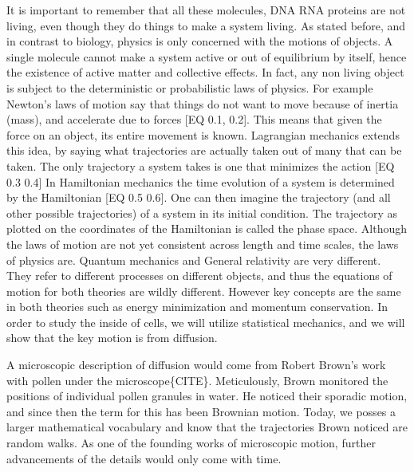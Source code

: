 \documentclass[draft, english]{volcanica-template}
\begin{document}
It is important to remember that all these molecules, DNA RNA proteins are not living, even though they do things to make a system living. As stated before, and in contrast to biology, physics is only concerned with the motions of objects. A single molecule cannot make a system active or out of equilibrium by itself, hence the existence of active matter and collective effects. In fact, any non living object is subject to the deterministic or probabilistic laws of physics. For example Newton's laws of motion say that things do not want to move because of inertia (mass), and accelerate due to forces
[EQ 0.1, 0.2].
This means that given the force on an object, its entire movement is known. Lagrangian mechanics extends this idea, by saying what trajectories are actually taken out of many that can be taken. The only trajectory a system takes is one that minimizes the action
[EQ 0.3 0.4]
In Hamiltonian mechanics the time evolution of a system is determined by the Hamiltonian
[EQ 0.5 0.6].
One can then imagine the trajectory (and all other possible trajectories) of a system in its initial condition. The trajectory as plotted on the coordinates of the Hamiltonian is called the phase space. Although the laws of motion are not yet consistent across length and time scales, the laws of physics are. Quantum mechanics and General relativity are very different. They refer to different processes on different objects, and thus the equations of motion for both theories are wildly different. However key concepts are the same in both theories such as energy minimization and momentum conservation. In order to study the inside of cells, we will utilize statistical mechanics, and we will show that the key motion is from diffusion.

A microscopic description of diffusion would come from Robert Brown's work with pollen under the microscope\{CITE\}. Meticulously, Brown monitored the positions of individual pollen granules in water. He noticed their sporadic motion, and since then the term for this has been Brownian motion. Today, we posses a larger mathematical vocabulary and know that the trajectories Brown noticed are random walks. As one of the founding works of microscopic motion, further advancements of the details would only come with time.
\end{document}
